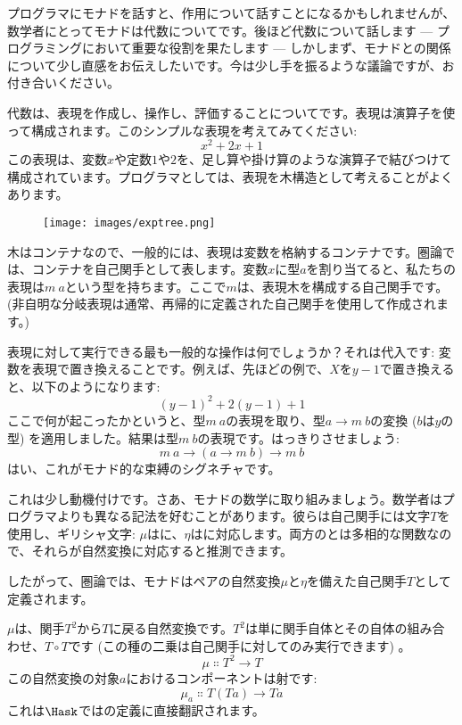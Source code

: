 
\lettrine[lhang=0.17]{プ}{ログラマ}にモナドを話すと、作用について話すことになるかもしれませんが、数学者にとってモナドは代数についてです。後ほど代数について話します --- プログラミングにおいて重要な役割を果たします --- しかしまず、モナドとの関係について少し直感をお伝えしたいです。今は少し手を振るような議論ですが、お付き合いください。

代数は、表現を作成し、操作し、評価することについてです。表現は演算子を使って構成されます。このシンプルな表現を考えてみてください: 
\[x^2 + 2 x + 1\]
この表現は、変数$x$や定数$1$や$2$を、足し算や掛け算のような演算子で結びつけて構成されています。プログラマとしては、表現を木構造として考えることがよくあります。

\begin{figure}[H]
  \centering
  \texttt{[image: images/exptree.png]}
\end{figure}

\noindent
木はコンテナなので、一般的には、表現は変数を格納するコンテナです。圏論では、コンテナを自己関手として表します。変数$x$に型$a$を割り当てると、私たちの表現は$m\ a$という型を持ちます。ここで$m$は、表現木を構成する自己関手です。(非自明な分岐表現は通常、再帰的に定義された自己関手を使用して作成されます。)

表現に対して実行できる最も一般的な操作は何でしょうか？それは代入です: 変数を表現で置き換えることです。例えば、先ほどの例で、$X$を$y - 1$で置き換えると、以下のようになります: 
\[(y - 1)^2 + 2 (y - 1) + 1\]
ここで何が起こったかというと、型$m\ a$の表現を取り、型$a \to m\ b$の変換 ($b$は$y$の型) を適用しました。結果は型$m\ b$の表現です。はっきりさせましょう: 
\[m\ a \to (a \to m\ b) \to m\ b\]
はい、これがモナド的な束縛のシグネチャです。

これは少し動機付けです。さあ、モナドの数学に取り組みましょう。数学者はプログラマよりも異なる記法を好むことがあります。彼らは自己関手には文字$T$を使用し、ギリシャ文字: $\mu$はに、$\eta$はに対応します。両方のとは多相的な関数なので、それらが自然変換に対応すると推測できます。

したがって、圏論では、モナドはペアの自然変換$\mu$と$\eta$を備えた自己関手$T$として定義されます。

$\mu$は、関手$T^2$から$T$に戻る自然変換です。$T^2$は単に関手自体とその自体の組み合わせ、$T \circ T$です (この種の二乗は自己関手に対してのみ実行できます) 。
\[\mu \Colon T^2 \to T\]
この自然変換の対象$a$におけるコンポーネントは射です: 
\[\mu_a \Colon T (T a) \to T a\]
これは$\Hask$ではの定義に直接翻訳されます。

